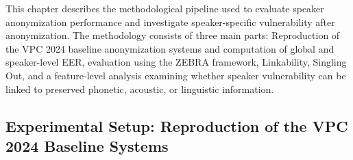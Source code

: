 \documentclass[12pt,leqno,a4paper]{article}
\begin{document}



This chapter describes the methodological pipeline used to evaluate speaker anonymization performance and investigate speaker-specific vulnerability 
after anonymization. The methodology consists of three main parts: Reproduction of the VPC 2024 baseline anonymization systems and computation of global and speaker-level EER, evaluation using the 
ZEBRA framework, Linkability, Singling Out, and a feature-level analysis examining whether speaker vulnerability can be linked to preserved phonetic, acoustic, or linguistic information.

\subsection{Experimental Setup: Reproduction of the VPC 2024 Baseline Systems}
\label{subsec:reproduction_vpc}
\end{document}
